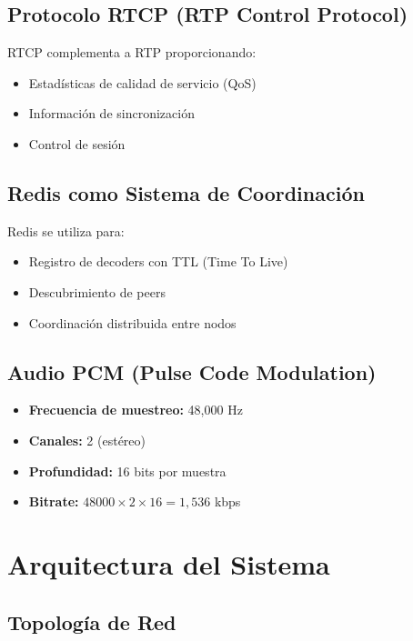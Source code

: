 \documentclass[12pt,a4paper]{article}
\begin{document}
\subsection{Protocolo RTCP (RTP Control Protocol)}

RTCP complementa a RTP proporcionando:

\begin{itemize}
    \item Estadísticas de calidad de servicio (QoS)
    \item Información de sincronización
    \item Control de sesión
\end{itemize}

\subsection{Redis como Sistema de Coordinación}

Redis se utiliza para:

\begin{itemize}
    \item Registro de decoders con TTL (Time To Live)
    \item Descubrimiento de peers
    \item Coordinación distribuida entre nodos
\end{itemize}

\subsection{Audio PCM (Pulse Code Modulation)}

\begin{itemize}
    \item \textbf{Frecuencia de muestreo:} 48,000 Hz
    \item \textbf{Canales:} 2 (estéreo)
    \item \textbf{Profundidad:} 16 bits por muestra
    \item \textbf{Bitrate:} $48000 \times 2 \times 16 = 1,536$ kbps
\end{itemize}

\newpage

\section{Arquitectura del Sistema}

\subsection{Topología de Red}
\end{document}
